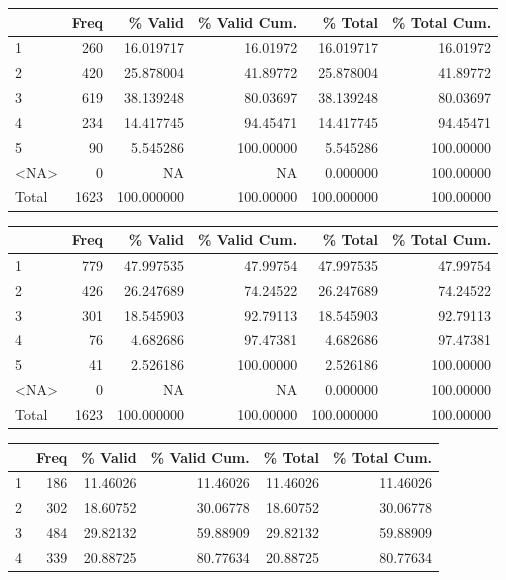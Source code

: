\documentclass[
  letterpaper,
  DIV=11,
  numbers=noendperiod]{scrartcl}
\begin{document}
\begin{table}
\begin{tabular}[t]{l|r|r|r|r|r}
\hline
\end{tabular}
\centering
\begin{tabular}[t]{l|r|r|r|r|r}
\hline
  & Freq & \% Valid & \% Valid Cum. & \% Total & \% Total Cum.\\
\hline
1 & 260 & 16.019717 & 16.01972 & 16.019717 & 16.01972\\
\hline
2 & 420 & 25.878004 & 41.89772 & 25.878004 & 41.89772\\
\hline
3 & 619 & 38.139248 & 80.03697 & 38.139248 & 80.03697\\
\hline
4 & 234 & 14.417745 & 94.45471 & 14.417745 & 94.45471\\
\hline
5 & 90 & 5.545286 & 100.00000 & 5.545286 & 100.00000\\
\hline
<NA> & 0 & NA & NA & 0.000000 & 100.00000\\
\hline
Total & 1623 & 100.000000 & 100.00000 & 100.000000 & 100.00000\\
\hline
\end{tabular}
\centering
\begin{tabular}[t]{l|r|r|r|r|r}
\hline
  & Freq & \% Valid & \% Valid Cum. & \% Total & \% Total Cum.\\
\hline
1 & 779 & 47.997535 & 47.99754 & 47.997535 & 47.99754\\
\hline
2 & 426 & 26.247689 & 74.24522 & 26.247689 & 74.24522\\
\hline
3 & 301 & 18.545903 & 92.79113 & 18.545903 & 92.79113\\
\hline
4 & 76 & 4.682686 & 97.47381 & 4.682686 & 97.47381\\
\hline
5 & 41 & 2.526186 & 100.00000 & 2.526186 & 100.00000\\
\hline
<NA> & 0 & NA & NA & 0.000000 & 100.00000\\
\hline
Total & 1623 & 100.000000 & 100.00000 & 100.000000 & 100.00000\\
\hline
\end{tabular}
\centering
\begin{tabular}[t]{l|r|r|r|r|r}
\hline
  & Freq & \% Valid & \% Valid Cum. & \% Total & \% Total Cum.\\
\hline
1 & 186 & 11.46026 & 11.46026 & 11.46026 & 11.46026\\
\hline
2 & 302 & 18.60752 & 30.06778 & 18.60752 & 30.06778\\
\hline
3 & 484 & 29.82132 & 59.88909 & 29.82132 & 59.88909\\
\hline
4 & 339 & 20.88725 & 80.77634 & 20.88725 & 80.77634\\

\end{tabular}
\end{table}
\end{document}
